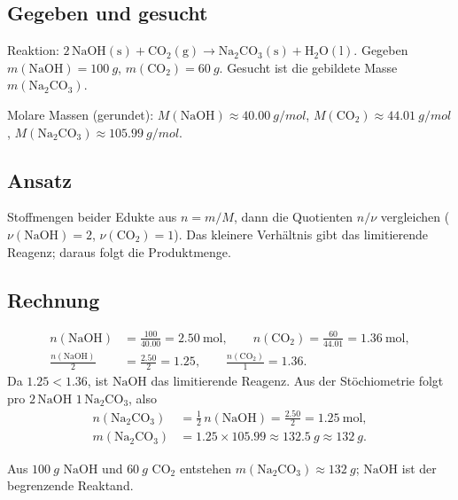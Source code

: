 
\subsection*{Gegeben und gesucht}
Reaktion: $2\,\mathrm{NaOH(s)} + \mathrm{CO_2(g)} \rightarrow
\mathrm{Na_2CO_3(s)} + \mathrm{H_2O(l)}$. Gegeben
$m(\mathrm{NaOH}) = \qty{100}{g}$, $m(\mathrm{CO_2}) = \qty{60}{g}$. Gesucht
ist die gebildete Masse $m(\mathrm{Na_2CO_3})$.

Molare Massen (gerundet): $M(\mathrm{NaOH}) \approx \qty{40.00}{g/mol}$,
$M(\mathrm{CO_2}) \approx \qty{44.01}{g/mol}$,
$M(\mathrm{Na_2CO_3}) \approx \qty{105.99}{g/mol}$.

\subsection*{Ansatz}
Stoffmengen beider Edukte aus $n=m/M$, dann die Quotienten $n/\nu$ vergleichen
($\nu(\mathrm{NaOH})=2$, $\nu(\mathrm{CO_2})=1$). Das kleinere Verhältnis
gibt das limitierende Reagenz; daraus folgt die Produktmenge.

\subsection*{Rechnung}
\begin{align*}
  n(\mathrm{NaOH}) &= \frac{100}{40.00} = 2.50\ \mathrm{mol}, \qquad
  n(\mathrm{CO_2}) = \frac{60}{44.01} = 1.36\ \mathrm{mol}, \\[2pt]
  \frac{n(\mathrm{NaOH})}{2} &= \frac{2.50}{2} = 1.25, \qquad
  \frac{n(\mathrm{CO_2})}{1} = 1.36.
\end{align*}
Da $1.25 < 1.36$, ist $\mathrm{NaOH}$ das limitierende Reagenz. Aus der
Stöchiometrie folgt pro $2\,\mathrm{NaOH}$
$1\,\mathrm{Na_2CO_3}$, also
\begin{align*}
  n(\mathrm{Na_2CO_3}) &= \frac{1}{2}\,n(\mathrm{NaOH}) = \frac{2.50}{2}
  = 1.25\ \mathrm{mol}, \\
  m(\mathrm{Na_2CO_3}) &= 1.25 \times 105.99
  \approx \qty{132.5}{g} \approx \qty{132}{g}.
\end{align*}

\begin{ergebnis}
Aus $\qty{100}{g}$ $\mathrm{NaOH}$ und $\qty{60}{g}$ $\mathrm{CO_2}$ entstehen
$m(\mathrm{Na_2CO_3}) \approx \qty{132}{g}$;
$\mathrm{NaOH}$ ist der begrenzende Reaktand.
\end{ergebnis}


